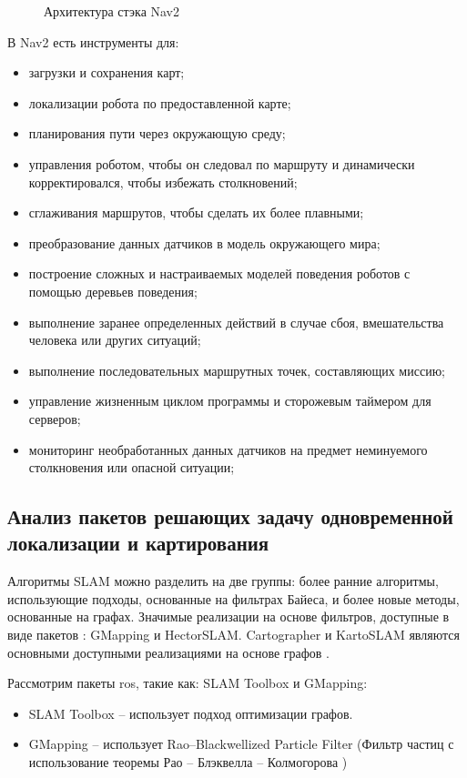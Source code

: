 \begin{figure}[h]
\centering
\caption{Архитектура стэка Nav2}
\end{figure}

В Nav2 есть инструменты для:
\begin{itemize}
	\item загрузки и сохранения карт;
	\item локализации робота по предоставленной карте;
	\item планирования пути через окружающую среду;
	\item управления роботом, чтобы он следовал по маршруту и динамически
		корректировался, чтобы избежать столкновений;
	\item сглаживания маршрутов, чтобы сделать их более плавными;
	\item преобразование данных датчиков в модель окружающего мира;
	\item построение сложных и настраиваемых моделей поведения роботов с
		помощью деревьев поведения;
	\item выполнение заранее определенных действий в случае сбоя, вмешательства
		человека или других ситуаций;
	\item выполнение последовательных маршрутных точек, составляющих миссию;
	\item управление жизненным циклом программы и сторожевым таймером для
		серверов;
	\item мониторинг необработанных данных датчиков на предмет неминуемого
		столкновения или опасной ситуации;
\end{itemize}

\subsection{Анализ пакетов \ros{} решающих задачу одновременной локализации и
картирования}

Алгоритмы SLAM можно разделить на две группы: более ранние алгоритмы,
использующие подходы, основанные на фильтрах Байеса, и более новые методы,
основанные на графах. Значимые реализации на основе фильтров, доступные в виде
пакетов \ros{}: GMapping и HectorSLAM. Cartographer и KartoSLAM являются
основными доступными реализациями на основе графов \cite{macenski2021slam}.

Рассмотрим пакеты ros{}, такие как: SLAM Toolbox и GMapping:
\begin{itemize}
	\item SLAM Toolbox -- использует подход оптимизации
		графов.
	\item GMapping \cite{grisetti2005improving} -- использует Rao–Blackwellized
		Particle Filter (Фильтр частиц с использование теоремы Рао -- Блэквелла --
		Колмогорова )
\end{itemize}

